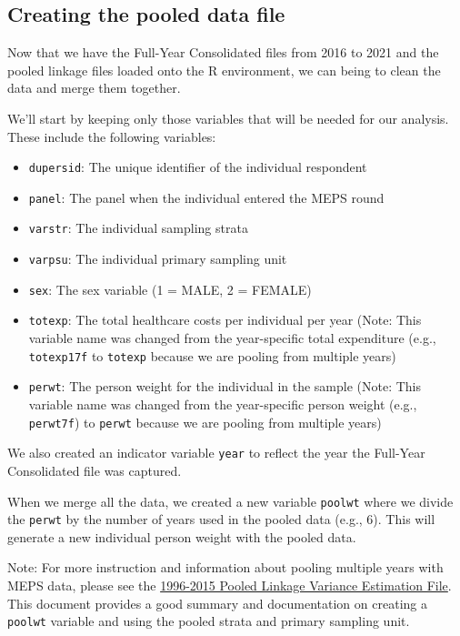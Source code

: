 \documentclass[
]{book}
\begin{document}
\hypertarget{creating-the-pooled-data-file}{%
\subsection{Creating the pooled data file}\label{creating-the-pooled-data-file}}

Now that we have the Full-Year Consolidated files from 2016 to 2021 and the pooled linkage files loaded onto the R environment, we can being to clean the data and merge them together.

We'll start by keeping only those variables that will be needed for our analysis. These include the following variables:

\begin{itemize}
\item
  \texttt{dupersid}: The unique identifier of the individual respondent
\item
  \texttt{panel}: The panel when the individual entered the MEPS round
\item
  \texttt{varstr}: The individual sampling strata
\item
  \texttt{varpsu}: The individual primary sampling unit
\item
  \texttt{sex}: The sex variable (1 = MALE, 2 = FEMALE)
\item
  \texttt{totexp}: The total healthcare costs per individual per year (Note: This variable name was changed from the year-specific total expenditure (e.g., \texttt{totexp17f} to \texttt{totexp} because we are pooling from multiple years)
\item
  \texttt{perwt}: The person weight for the individual in the sample (Note: This variable name was changed from the year-specific person weight (e.g., \texttt{perwt7f}) to \texttt{perwt} because we are pooling from multiple years)
\end{itemize}

We also created an indicator variable \texttt{year} to reflect the year the Full-Year Consolidated file was captured.

When we merge all the data, we created a new variable \texttt{poolwt} where we divide the \texttt{perwt} by the number of years used in the pooled data (e.g., 6). This will generate a new individual person weight with the pooled data.

Note: For more instruction and information about pooling multiple years with MEPS data, please see the \href{https://meps.ahrq.gov/data_stats/download_data/pufs/h36/h36u15doc.shtml}{1996-2015 Pooled Linkage Variance Estimation File}. This document provides a good summary and documentation on creating a \texttt{poolwt} variable and using the pooled strata and primary sampling unit.
\end{document}
